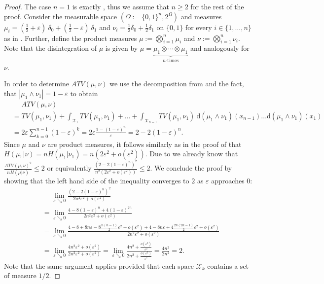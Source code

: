 \documentclass[10pt,a4paper]{amsart}
\newcommand{\X}{\mathcal X}
\begin{document}
\begin{proof}
    The case $n=1$ is exactly , thus we assume that $n \ge 2$ for the rest of the proof. Consider the measurable space $(\Omega:=\{0,1\}^n,2^\Omega)$ and measures $\mu_i=(\frac{1}{2}+\varepsilon)\ \delta_0 + (\frac{1}{2}-\varepsilon)\ \delta_1$ and $\nu_i = \frac{1}{2}\delta_0+\frac{1}{2}\delta_1$ on $\{0,1\}$ for every $i\in \{1,\ldots,n\}$ as in . Further, define the product measures $\mu := \bigotimes_{i=1}^n \mu_i$ and $\nu := \bigotimes_{i=1}^n \nu_i$. Note that the disintegration of $\mu$ is given by $\mu=\underbrace{\mu_1 \otimes \cdots \otimes \mu_1}_\text{$n$-times}$ 
    and analogously for $\nu$.

    In order to determine $ATV(\mu,\nu)$ we use the decomposition from  and the fact, that $|\mu_1 \wedge \nu_1| = 1-\varepsilon$ to obtain
    \begin{align*}
        & \phantom{=} ATV(\mu,\nu) \\
        & = TV(\mu_1,\nu_1)+\int_{\X_1} TV(\mu_1,\nu_1)+\ldots +\int_{\X_{n-1}} TV(\mu_1,\nu_1) \ \mathrm{d}(\mu_1 \wedge \nu_1)(x_{n-1}) \ldots \mathrm{d}(\mu_1 \wedge \nu_1)(x_1) \\
        & = 2\varepsilon \sum_{k=0}^{n-1}(1-\varepsilon)^k  = 2\varepsilon \frac{1-(1-\varepsilon)^n}{\varepsilon}  = 2-2(1-\varepsilon)^n.
    \end{align*}
    Since $\mu$ and $\nu$ are product measures, it follows similarly as in the proof of  that $H(\mu,|\nu) = n H(\mu_1|\nu_1) = n (2\varepsilon^2+o(\varepsilon^2))$. Due to  we  already know that $\frac{ATV(\mu,\nu)^2}{nH(\mu|\nu)}\leq2$ or equivalently $\frac{(2-2(1-\varepsilon)^n)^2}{n^2(2\varepsilon^2+o(\varepsilon^2))} \leq 2$. We conclude the proof by showing that the left hand side of the inequality converges to $2$ as $\varepsilon$ approaches $0$:
    \begin{align*}
        & \phantom{=} \lim_{\varepsilon \searrow 0} \frac{(2-2(1-\varepsilon)^n)^2}{2n^2\varepsilon^2+o(\varepsilon^2)} \\
        & = \lim_{\varepsilon \searrow 0} \frac{4-8(1-\varepsilon)^n+4(1-\varepsilon)^{2n}}{2n^2\varepsilon^2+o(\varepsilon^2)} \\ 
        & = \lim_{\varepsilon \searrow 0} \frac{4-8+8n\varepsilon-8\frac{n(n-1)}{2}\varepsilon^2+o(\varepsilon^2)+4-8n\varepsilon+4\frac{2n(2n-1)}{2}\varepsilon^2+o(\varepsilon^2)}{2n^2\varepsilon^2+o(\varepsilon^2)} \\
        & = \lim_{\varepsilon \searrow 0} \frac{4n^2\varepsilon^2+o(\varepsilon^2)}{2n^2\varepsilon^2+o(\varepsilon^2)} 
         = \lim_{\varepsilon \searrow 0} \frac{4n^2+\frac{o(\varepsilon^2)}{\varepsilon^2}}{2n^2+\frac{o(\varepsilon^2)}{\varepsilon^2}} 
         = \frac{4n^2}{2n^2} = 2.
    \end{align*}
    Note that the same argument applies provided that each space $\X_k$ contains a set of measure $1/2$.
\end{proof}
\end{document}
